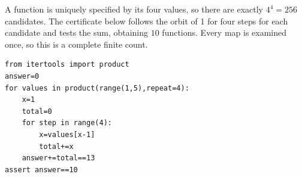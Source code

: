 A function is uniquely specified by its four values, so there are exactly $4^4=256$ candidates. The certificate below follows the orbit of 1 for four steps for each candidate and tests the sum, obtaining $\boxed{10}$ functions. Every map is examined once, so this is a complete finite count.
\begin{verbatim}
from itertools import product
answer=0
for values in product(range(1,5),repeat=4):
    x=1
    total=0
    for step in range(4):
        x=values[x-1]
        total+=x
    answer+=total==13
assert answer==10
\end{verbatim}
